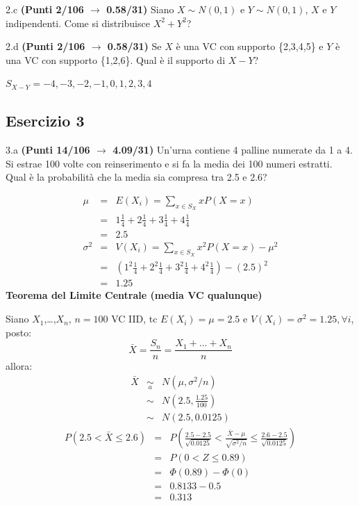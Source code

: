 \documentclass[
  11pt,
]{book}
\theoremstyle{mytheoremstyle}
\theoremstyle{mydefstyle}
\newenvironment{sol}
  {
  \begin{tcolorbox}[enhanced,breakable,arc=0.1mm,boxrule=1pt,colback=white,colframe=iblue,
  title=\bf \fontfamily{lmss}\selectfont \hspace{.5 cm} Soluzione,drop fuzzy shadow]

}{
\end{tcolorbox}
  }
\begin{document}
2.c \textbf{(Punti 2/106 \(\rightarrow\) 0.58/31)} Siano \(X\sim N(0,1)\) e \(Y\sim N(0,1)\), \(X\) e \(Y\) indipendenti.
Come si distribuisce \(X^2+Y^2\)?

2.d \textbf{(Punti 2/106 \(\rightarrow\) 0.58/31)} Se \(X\) è una VC con supporto \{2,3,4,5\} e \(Y\) è una VC con supporto
\{1,2,6\}.
Qual è il supporto di \(X-Y\)?

\begin{sol}
\(S_{X-Y}=-4, -3, -2, -1, 0, 1, 2, 3, 4\)

\end{sol}

\subsection{Esercizio 3}\label{esercizio-3-17}

3.a \textbf{(Punti 14/106 \(\rightarrow\) 4.09/31)} Un'urna contiene 4 palline numerate da 1 a 4.
Si estrae 100 volte con reinserimento e si fa la media dei 100 numeri
estratti. Qual è la probabilità che la media sia compresa tra 2.5 e 2.6?

\begin{sol}
\begin{eqnarray*} \mu &=& E(X_i) = \sum_{x\in S_X}x P(X=x)\\ 
 &=&  1  \frac { 1 }{ 4 }+ 2  \frac { 1 }{ 4 }+ 3  \frac { 1 }{ 4 }+ 4  \frac { 1 }{ 4 } \\ 
            &=& 2.5 \\ 
 \sigma^2 &=& V(X_i) = \sum_{x\in S_X}x^2 P(X=x)-\mu^2\\ 
 &=&\left(  1  ^2\frac { 1 }{ 4 }+ 2  ^2\frac { 1 }{ 4 }+ 3  ^2\frac { 1 }{ 4 }+ 4  ^2\frac { 1 }{ 4 } \right)-( 2.5 )^2\\ 
            &=& 1.25 
\end{eqnarray*}
\textbf{Teorema del Limite Centrale (media VC qualunque)}

Siano \(X_1\),\ldots,\(X_n\), \(n=100\) VC IID, tc \(E(X_i)=\mu=2.5\) e \(V(X_i)=\sigma^2=1.25,\forall i\), posto:
\[
      \bar X=\frac{S_n}n =\frac{X_1 + ... + X_n}n
      \]
allora:\begin{eqnarray*}
  \bar X & \mathop{\sim}\limits_{a}& N(\mu,\sigma^2/n) \\
     &\sim & N\left(2.5,\frac{1.25}{100}\right) \\
     &\sim & N(2.5,0.0125)
  \end{eqnarray*}\begin{eqnarray*}
   P( 2.5 < \bar X \leq  2.6 ) &=& P\left( \frac { 2.5  -  2.5 }{\sqrt{ 0.0125 }} < \frac { \bar X  -  \mu }{ \sqrt{\sigma^2/n} } \leq \frac { 2.6  -  2.5 }{\sqrt{ 0.0125 }}\right)  \\
              &=& P\left(  0  < Z \leq  0.89 \right) \\
              &=& \Phi( 0.89 )-\Phi( 0 )\\
              &=&  0.8133 - 0.5 \\ 
              &=&  0.313 
   \end{eqnarray*}

\end{sol}
\end{document}
